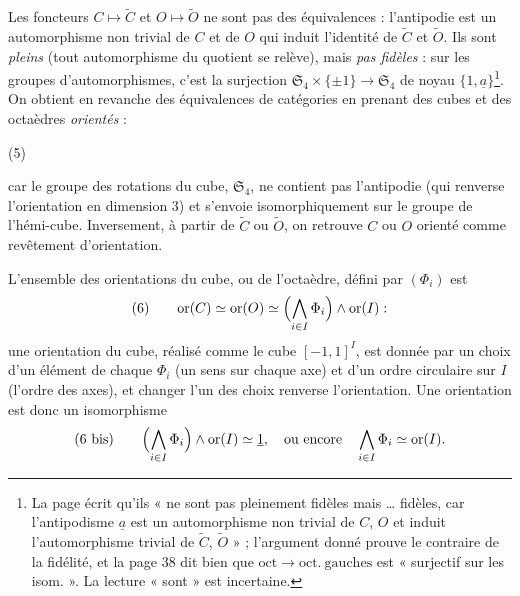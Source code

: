\documentclass[11pt,a4paper]{article}
\begin{document}
Les foncteurs $C \mapsto \widetilde{C}$ et $O \mapsto \widetilde{O}$ ne sont
pas des équivalences : l'antipodie est un automorphisme non trivial de $C$
et de $O$ qui induit l'identité de $\widetilde{C}$ et $\widetilde{O}$. Ils
sont \emph{pleins} (tout automorphisme du quotient se relève), mais
\emph{pas fidèles} : sur les groupes d'automorphismes, c'est la surjection
$\mathfrak{S}_4 \times \{\pm 1\} \to \mathfrak{S}_4$ de noyau $\{1,
\underline{a}\}$\footnote{La page écrit qu'ils « ne sont pas pleinement
fidèles mais \ldots{} fidèles, car l'antipodisme $\underline{a}$ est un
automorphisme non trivial de $C$, $O$ et induit l'automorphisme trivial de
$\widetilde{C}$, $\widetilde{O}$ » ; l'argument donné prouve le contraire de
la fidélité, et la page 38 dit bien que $\mathrm{oct} \to
\mathrm{oct.\ gauches}$ est « surjectif sur les isom. ». La lecture « sont » est
incertaine.}. On obtient en revanche des équivalences de catégories en
prenant des cubes et des octaèdres \emph{orientés} :

(5)


car le groupe des rotations du cube, $\mathfrak{S}_4$, ne contient pas
l'antipodie (qui renverse l'orientation en dimension $3$) et s'envoie
isomorphiquement sur le groupe de l'hémi-cube. Inversement, à partir de
$\widetilde{C}$ ou $\widetilde{O}$, on retrouve $C$ ou $O$ orienté comme
revêtement d'orientation.

L'ensemble des orientations du cube, ou de l'octaèdre, défini par $(\Phi_i)$
est
\[
(6) \qquad \mathrm{or}(C) \simeq \mathrm{or}(O) \simeq \Bigl(\bigwedge_{i \in I}
\Phi_i\Bigr) \wedge \mathrm{or}(I) :
\]
une orientation du cube, réalisé comme le cube $[-1,1]^{I}$, est
donnée par un choix d'un élément de chaque $\Phi_i$ (un sens sur chaque axe)
et d'un ordre circulaire sur $I$ (l'ordre des axes), et changer l'un des
choix renverse l'orientation. Une orientation est donc un isomorphisme
\[
(6\ \text{bis}) \qquad \Bigl(\bigwedge_{i \in I} \Phi_i\Bigr) \wedge \mathrm{or}(I)
\simeq \underline{1}, \quad \text{ou encore} \quad \bigwedge_{i \in I} \Phi_i
\simeq \mathrm{or}(I).
\]
\end{document}
